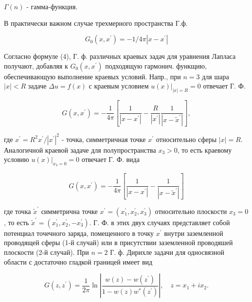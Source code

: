 \documentclass[10pt]{article}
\begin{document}
$\Gamma(n)$ - гамма-функция.



В практически важном случае трехмерного пространства Г.ф.



\[

G_{0}\left(x, x^{\prime}\right)=-1 / 4 \pi\left|x-x^{\prime}\right|

\]



Согласно формуле (4), Г. ф. различных краевых задач для уравнения Лапласа получают, добавляя к $G_{0}\left(x, x^{\prime}\right)$ подходящую гармонич. функщию, обеспечивающую выполнение краевых условий. Напр., при $n=3$ для шара $|x|<R$ задаче $\Delta u=f(x)$ с краевым условием $\left.u(x)\right|_{|x|=R}=0$ отвечает $Г$. $Ф$.



\[

G\left(x, x^{\prime}\right)=-\frac{1}{4 \pi}\left[\frac{1}{\left|x-x^{\prime}\right|}-\frac{R}{\left|x^{\prime}\right|} \frac{1}{\left|x-\tilde{x}^{\prime}\right|}\right],

\]



где $x^{\prime}=R^{2} x^{\prime} /\left|x^{\prime}\right|^{2}$ - точка, симметричная точке $x^{\prime}$ относительно сферы $|x|=R$. Аналогичной краевой задаче для полупространства $x_{3}>0$, то есть краевому условию $\left.u(x)\right|_{x_{3}=0}=0$ отвечает Г. Ф. вида



\[

G\left(x, x^{\prime}\right)=-\frac{1}{4 \pi}\left[\frac{1}{\left|x-x^{\prime}\right|}-\frac{1}{\left|x-\tilde{x}^{\prime}\right|}\right]

\]



где точка $\tilde{x}^{\prime}$ симметрична точке $x^{\prime}=\left(x_{1}^{\prime}, x_{2}^{\prime}, x_{3}^{\prime}\right)$ относительно плоскости $x_{3}=0$, то есть $\tilde{x}^{\prime}=\left(x_{1}^{\prime}, x_{2}^{\prime},-x_{3}^{\prime}\right)$. Г. Ф. в этих двух случаях представляет собой потенциал точечного заряда, помещенного в точку $x^{\prime}$ внутри заземленной проводящей сферы (1-й случай) или в присутствии заземленной проводяшей плоскости (2-й случай). При $n=2$ Г. ф. Дирихле задачи для односвязной области с достаточно гладкой границей имеет вид



\[

G\left(z, z^{\prime}\right)=\frac{1}{2 \pi} \ln \left|\frac{w(z)-w\left(z^{\prime}\right)}{1-w(z) w^{*}\left(z^{\prime}\right)}\right|, \quad z=x_{1}+i x_{2} .

\]
\end{document}
